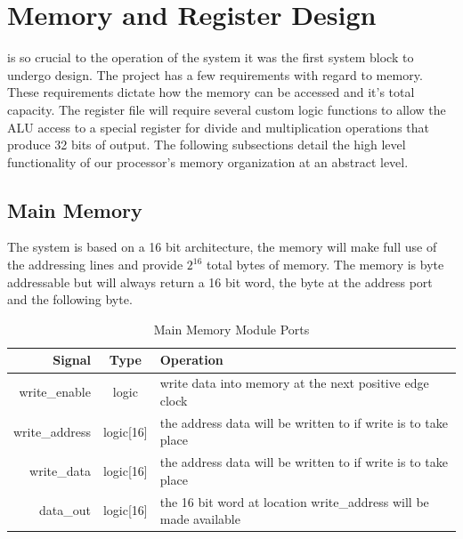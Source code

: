 \section{Memory and Register Design}
 is so crucial to the operation of the system it was the first system block to undergo design. The project has a few requirements with regard to memory. These requirements dictate how the memory can be accessed and it's total capacity. The register file will require several custom logic functions to allow the ALU access to a special register for divide and multiplication operations that produce 32 bits of output. The following subsections detail the high level functionality of our processor's memory organization at an abstract level.

    \subsection{Main Memory}
    The system is based on a 16 bit architecture, the memory will make full use of the addressing lines and provide $2^{16}$ total bytes of memory. The memory is byte addressable but will always return a 16 bit word, the byte at the address port and the following byte.
    \begin{table}[H]
        \caption{Main Memory Module Ports}
        \label{mainmemory}
        \centering
        \begin{tabular}{r c p{4.5cm}}
        Signal      &Type    & Operation\\
        \hline
        write\_enable  & logic & write data into memory at the next positive edge clock \\
        write\_address & logic[16] & the address data will be written to if write is to take place \\
        write\_data    & logic[16] & the address data will be written to if write is to take place \\
        data\_out      & logic[16] & the 16 bit word at location write\_address will be made available\\
        \end{tabular}
    \end{table}

